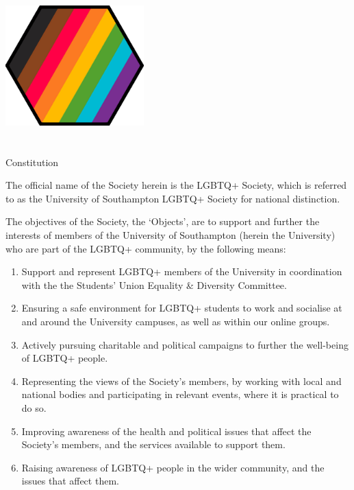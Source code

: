 \documentclass[12pt]{constitution}
\begin{document}
\begin{titlepage}
\begin{center}

\vspace*{5cm}
\includegraphics[width=0.4\textwidth]{logo-transparent.png}\\
\vspace{0.5cm}
{\fontsize{40}{48}}\\
\vspace{0.15cm}
{\fontsize{40}{48}}\\
\vspace{0.4cm}
{\fontsize{30}{36}\selectfont Constitution}\\
\end{center}
\end{titlepage}


\label{article:name}

The official name of the Society herein is the LGBTQ+ Society, which is referred to as the University of Southampton LGBTQ+ Society for national distinction.


\label{article:objects}

The objectives of the Society, the `Objects', are to support and further the interests of members of the University of Southampton (herein the University) who are part of the LGBTQ+ community, by the following means:

\begin{enumerate}
    \item Support and represent LGBTQ+ members of the University in coordination with the the Students' Union Equality \& Diversity Committee.
    \item Ensuring a safe environment for LGBTQ+ students to work and socialise at and around the University campuses, as well as within our online groups.
    \item Actively pursuing charitable and political campaigns to further the well-being of LGBTQ+ people.
    \item Representing the views of the Society’s members, by working with local and national bodies and participating in relevant events, where it is practical to do so.
    \item Improving awareness of the health and political issues that affect the Society’s members, and the services available to support them.
    \item Raising awareness of LGBTQ+ people in the wider community, and the issues that affect them.
\end{enumerate}
\end{document}
